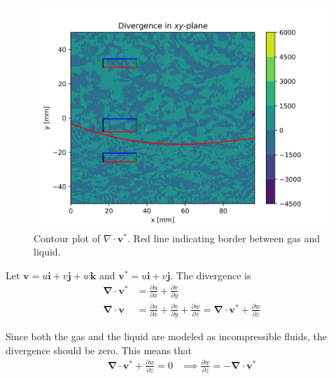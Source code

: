 \documentclass[a4paper,10pt,english]{article}
\begin{document}
\newpage
\begin{figure}[h!]
    \centering
    \includegraphics[scale=0.65]{../figures/task_d.png}
    \caption{Contour plot of $\nabla \cdot \bm{v}^*$. Red line indicating border between gas and liquid.}
    \label{fig:contour_d}
\end{figure}

Let $\bm{v} = u\bm{i} + v\bm{j} + w\bm{k}$ and $\bm{v}^* = u\bm{i} + v\bm{j}$. The divergence is
\begin{align*}
    \mathbf{\nabla} \cdot \bm{v}^*
    &= \frac{\partial u}{\partial x} + \frac{\partial v}{\partial y} \\
    \mathbf{\nabla} \cdot \bm{v}
    &= \frac{\partial u}{\partial x} + \frac{\partial v}{\partial y} + \frac{\partial w}{\partial z}
    = \mathbf{\nabla} \cdot \bm{v}^* + \frac{\partial w}{\partial z}
\end{align*}

Since both the gas and the liquid are modeled as incompressible fluids, the divergence should be zero. This means that 
\begin{align*}
    \mathbf{\nabla} \cdot \bm{v}^* + \frac{\partial w}{\partial z} = 0 &
    \implies \frac{\partial w}{\partial z}
    = - \mathbf{\nabla} \cdot \bm{v}^*
\end{align*}
\end{document}
